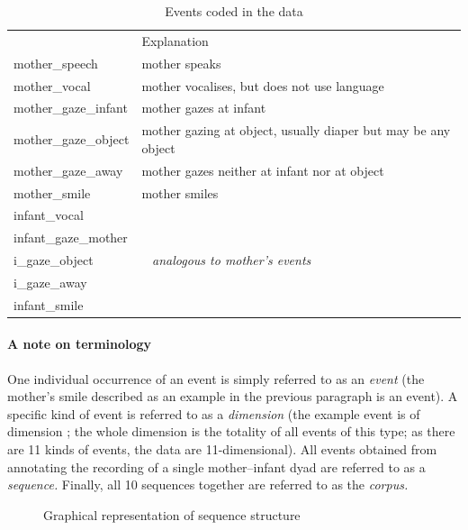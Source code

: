 \begin{table}[h]
	\centering
	\begin{tabularx}{\textwidth}{>{\ttfamily}lX} 
		\toprule
		{\rmfamily Event}		& Explanation \\
		\cmidrule(lr){1-1} \cmidrule(lr){2-2}
		mother\_speech			& mother speaks \\
		mother\_vocal			& mother vocalises, but does not use language \\
		mother\_gaze\_infant	& mother gazes at infant \\
		mother\_gaze\_object	& mother gazing at object, usually diaper but may be any object \\
		mother\_gaze\_away		& mother gazes neither at infant nor at object \\
		mother\_smile			& mother smiles \\
		\cmidrule(lr){1-1} \cmidrule(lr){2-2}
		infant\_vocal \\
		infant\_gaze\_mother \\
		i\_gaze\_object			& ~ \hfill \textit{analogous to mother's events} \hfill ~ \\
		i\_gaze\_away \\
		infant\_smile \\
		\bottomrule
	\end{tabularx}
	\caption{Events coded in the data}
	\label{tab:events}
\end{table}

\paragraph{A note on terminology}
One individual occurrence of an event is simply referred to as an \emph{event} (the mother's smile described as an example in the previous paragraph is an event).
A specific kind of event is referred to as a \emph{dimension} (the example event is of dimension ; the whole dimension  is the totality of all events of this type; as there are 11 kinds of events, the data are 11-dimensional).
All events obtained from annotating the recording of a single mother--infant dyad are referred to as a \emph{sequence.}
Finally, all 10 sequences together are referred to as the \emph{corpus.}

\begin{figure}
	\centering
	
	\caption{Graphical representation of sequence structure}
	\label{fig:idealseq}
\end{figure}

